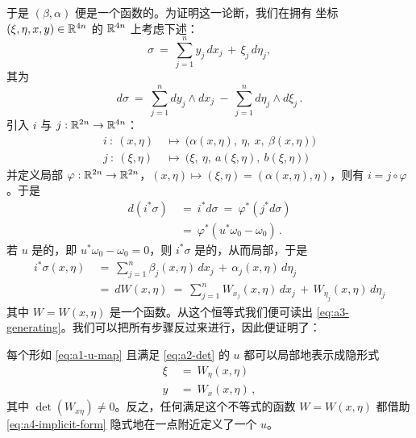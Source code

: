 于是 $(\beta,\alpha)$ 便是一个函数的\trGradient。为证明这一论断，我们在拥有%
坐标 $(\xi,\eta,x,y)\in\mathbb{R}^{4n}$ 的 $\mathbb{R}^{4n}$ 上考虑下述\trOneForm：
\[
\sigma\ =\ \sum_{j=1}^{n}y_{j}\,dx_{j}\,+\,\xi_{j}\,d\eta_{j},
\]
其\trExteriorDerivative{}为\trTwoForm
\[
d\sigma\ =\ \sum_{j=1}^{n}dy_{j}\wedge dx_{j}\ -\ \sum_{j=1}^{n}d\eta_{j}\wedge d\xi_{j}\,.
\]
引入\trEmbedding{} $i$ 与 $j:\mathbb{R}^{2n}\to\mathbb{R}^{4n}$：
\[
\begin{aligned}
i\ :\ (x,\eta)\ &\mapsto\ \bigl(\alpha(x,\eta),\ \eta,\ x,\ \beta(x,\eta)\bigr)\\
j\ :\ (\xi,\eta)\ &\mapsto\ \bigl(\xi,\ \eta,\ a(\xi,\eta),\ b(\xi,\eta)\bigr)
\end{aligned}
\]
并定义局部\trDiffeomorphism{} $\varphi:\mathbb{R}^{2n}\to\mathbb{R}^{2n}$，$(x,\eta)\mapsto%
(\xi,\eta)=(\alpha(x,\eta),\eta)$，则有 $i=j\circ\varphi$。于是
\[
\begin{aligned}
d(i^{*}\sigma)\ &=\ i^{*}d\sigma\ =\ \varphi^{*}(j^{*}d\sigma)\\
&=\ \varphi^{*}(u^{*}\omega_{0}-\omega_{0})\,.
\end{aligned}
\]
若 $u$ 是\trSymplectic{}的，即 $u^{*}\omega_{0}-\omega_{0}=0$，则 $i^{*}\sigma$ %
是\trClosed{}的，从而局部\trExact，于是
\[
\begin{aligned}
i^{*}\sigma(x,\eta)\ &=\ \sum_{j=1}^{n}\beta_{j}(x,\eta)\,dx_{j}\,+\,\alpha_{j}(x,\eta)\,d\eta_{j}\\
&=\ dW(x,\eta)\ =\ \sum_{j=1}^{n}W_{x_{j}}(x,\eta)\,dx_{j}\,+\,W_{\eta_{j}}(x,\eta)\,d\eta_{j}
\end{aligned}
\]
其中 $W=W(x,\eta)$ 是一个函数。从这个恒等式我们便可读出%
 \eqref{eq:a3-generating}。我们可以把所有步骤反过来进行，因此便证明了：

\begin{proposition}\label{prop:a1-generating-representation}
每个形如 \eqref{eq:a1-u-map} 且满足 \eqref{eq:a2-det} 的\trSymplectic\trMapping{}%
$u$ 都可以局部地表示成隐形式
\begin{equation}\label{eq:a4-implicit-form}
\begin{aligned}
\xi\ &=\ W_{\eta}(x,\eta)\\
y\ &=\ W_{x}(x,\eta)\,,
\end{aligned}
\end{equation}
其中 $\det(W_{x\eta})\neq0$。反之，任何满足这个不等式的\trSmooth{}函数%
$W=W(x,\eta)$ 都借助 \eqref{eq:a4-implicit-form} 隐式地在一点附近定义了一个%
\trSymplectic\trMapping{} $u$。
\end{proposition}

